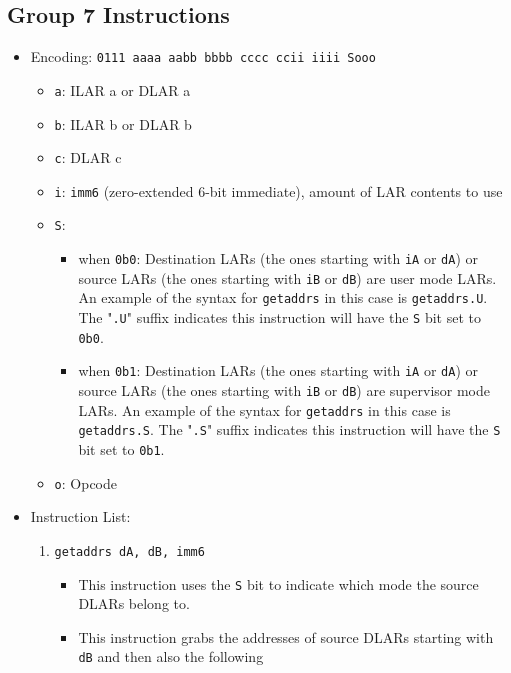 \documentclass{article}
\begin{document}
	\subsection{Group 7 Instructions}
		\begin{itemize}
		\item Encoding: \texttt{0111 aaaa aabb bbbb  cccc ccii iiii Sooo}
			\begin{itemize}
			\item \texttt{a}: ILAR a or DLAR a
			\item \texttt{b}: ILAR b or DLAR b
			\item \texttt{c}: DLAR c
			\item \texttt{i}: \texttt{imm6} (zero-extended 6-bit
				immediate), amount of LAR contents to use
			\item \texttt{S}:
				\begin{itemize}
				\item when \texttt{0b0}: Destination LARs (the ones
					starting with \texttt{iA} or \texttt{dA}) or source
					LARs (the ones starting with \texttt{iB} or
					\texttt{dB}) are user mode LARs. An example of the
					syntax for \texttt{getaddrs} in this case is
					\texttt{getaddrs.U}. The "\texttt{.U}" suffix indicates
					this instruction will have the \texttt{S} bit set to
					\texttt{0b0}.
				\item when \texttt{0b1}: Destination LARs (the ones
					starting with \texttt{iA} or \texttt{dA}) or source
					LARs (the ones starting with \texttt{iB} or
					\texttt{dB}) are supervisor mode LARs. An example of
					the syntax for \texttt{getaddrs} in this case is
					\texttt{getaddrs.S}. The "\texttt{.S}" suffix indicates
					this instruction will have the \texttt{S} bit set to
					\texttt{0b1}.
				\end{itemize}
			\item \texttt{o}: Opcode
			\end{itemize}
		\item Instruction List:
			\begin{enumerate}
			\item \texttt{getaddrs dA, dB, imm6}
				\begin{itemize}
				\item This instruction uses the \texttt{S} bit to indicate
					which mode the source DLARs belong to.
				\item This instruction grabs the addresses of source DLARs
					starting with \texttt{dB} and then also the following

\end{itemize}
\end{enumerate}
\end{itemize}
\end{document}
